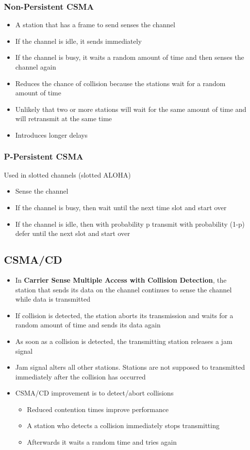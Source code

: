 \documentclass{article}[18pt]
\begin{document}
\subsubsection{Non-Persistent CSMA}
\begin{itemize}
	\item A station that has a frame to send senses the channel
	\item If the channel is idle, it sends immediately
	\item If the channel is busy, it waits a random amount of time and then senses the channel again
	\item Reduces the chance of collision because the stations wait for a random amount of time
	\item Unlikely that two or more stations will wait for the same amount of time and will retransmit at the same time
	\item Introduces longer delays
\end{itemize}
\subsubsection{P-Persistent CSMA}
Used in slotted channels (slotted ALOHA)
\begin{itemize}
	\item Sense the channel
	\item If the channel is busy, then wait until the next time slot and start over
	\item If the channel is idle, then with probability p transmit with probability (1-p) defer until the next slot and start over
\end{itemize}
\subsection{CSMA/CD}
\begin{itemize}
	\item In \textbf{Carrier Sense Multiple Access with Collision Detection}, the station that sends its data on the channel continues to sense the channel while data is transmitted
	\item If collision is detected, the station aborts its transmission and waits for a random amount of time and sends its data again
	\item As soon as a collision is detected, the transmitting station releases a jam signal
	\item Jam signal alters all other stations. Stations are not supposed to transmitted immediately after the collision has occurred
	\item CSMA/CD improvement is to detect/abort collisions
	\begin{itemize}
		\item Reduced contention times improve performance
		\item A station who detects a collision immediately stops transmitting
		\item Afterwards it waits a random time and tries again
	\end{itemize}
\end{itemize}
\end{document}
